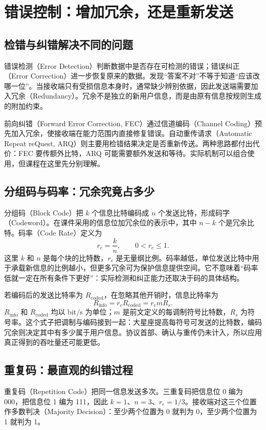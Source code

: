 \section{错误控制：增加冗余，还是重新发送}
\subsection{检错与纠错解决不同的问题}
错误检测（Error Detection）判断数据中是否存在可检测的错误；错误纠正（Error Correction）进一步恢复原来的数据。发现“答案不对”不等于知道“应该改哪一位”。当接收端只有受损信息本身时，通常缺少辨别依据，因此发送端需要加入冗余（Redundancy）。冗余不是独立的新用户信息，而是由原有信息按规则生成的附加约束。

前向纠错（Forward Error Correction, FEC）通过信道编码（Channel Coding）预先加入冗余，使接收端在能力范围内直接修复错误。自动重传请求（Automatic Repeat reQuest, ARQ）则主要用检错结果决定是否重新传送。两种思路都付出代价：FEC 要传额外比特，ARQ 可能需要额外发送和等待。实际机制可以组合使用，但课程在这里先分别理解。

\subsection{分组码与码率：冗余究竟占多少}
分组码（Block Code）把 $k$ 个信息比特编码成 $n$ 个发送比特，形成码字（Codeword）。在课件采用的信息位加冗余位的表示中，其中 $n-k$ 个是冗余比特。码率（Code Rate）定义为
\begin{equation}
r_c=\frac{k}{n},\qquad 0<r_c\leq 1.
\end{equation}
这里 $k$ 和 $n$ 是每个块的比特数，$r_c$ 是无量纲比例。码率越低，单位发送比特中用于承载新信息的比例越小，但更多冗余可为保护信息提供空间。它不意味着“码率低就一定在所有条件下更好”：实际检测和纠正能力还取决于码的具体结构。

若编码后的发送比特率为 $R_{\mathrm{coded}}$，在忽略其他开销时，信息比特率为
\begin{equation}
R_{\mathrm{info}}=r_cR_{\mathrm{coded}}=r_cmR_s.
\end{equation}
$R_{\mathrm{info}}$ 和 $R_{\mathrm{coded}}$ 均以 bit/s 为单位；$m$ 是前文定义的每调制符号比特数，$R_s$ 为符号率。这个式子把调制与编码接到一起：大星座提高每符号可发送的比特数，编码冗余则决定其中有多少属于用户信息。协议首部、确认与重传仍未计入，所以应用真正得到的吞吐量还可能更低。

\subsection{重复码：最直观的纠错过程}
重复码（Repetition Code）把同一信息发送多次。三重复码把信息位 0 编为 000，把信息位 1 编为 111，因此 $k=1$、$n=3$、$r_c=1/3$。接收端对这三个位置作多数判决（Majority Decision）：至少两个位置为 0 就判为 0，至少两个位置为 1 就判为 1。

